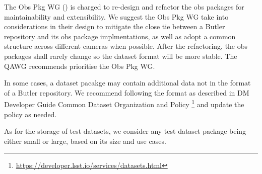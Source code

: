 The Obs Pkg WG () is charged to re-design and refactor
the obs packages for maintainability and extensibility. We suggest
the Obs Pkg WG take into considerations in their design to mitigate
the close tie between a Butler repository and its obs package
implmentations, as well as adopt a common structure across different
cameras when possible.  After the refactoring, the obs packages
shall rarely change so the dataset format will be more stable.  The
QAWG recommends prioritise the Obs Pkg WG.

In some cases, a dataset pacakge may contain additional data not
in the format of a Butler repository. We recommend following the
format as described in DM Developer Guide Common Dataset Organization
and Policy \footnote{\url{https://developer.lsst.io/services/datasets.html}}
and update the policy as needed.

As for the storage of test datasets, we consider any test dataset
package being either small or large, based on its size and use cases.

